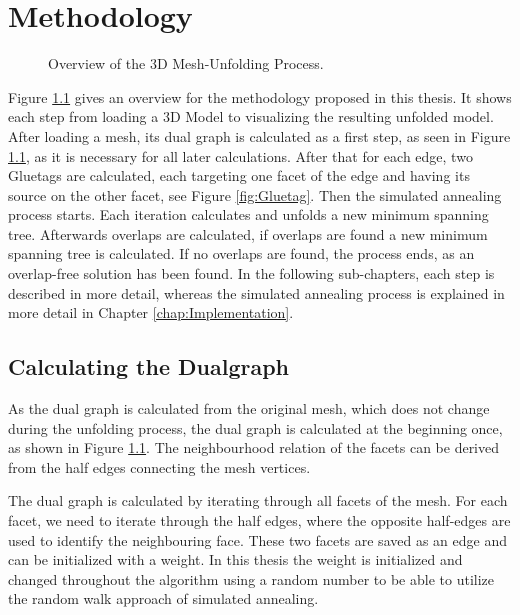 \documentclass[draft,final]{vutinfth} %
\begin{document}
\chapter{Methodology}
\label{chap:methodology}

\begin{figure}

\caption{Overview of the 3D Mesh-Unfolding Process.}
\label{fig:overview}
\end{figure}

Figure \ref{fig:overview} gives an overview for the methodology proposed in this thesis. It shows each step from loading a 3D Model to visualizing the resulting unfolded model. After loading a mesh, its dual graph is calculated as a first step, as seen in Figure \ref{fig:overview}, as it is necessary for all later calculations. After that for each edge, two Gluetags are calculated, each targeting one facet of the edge and having its source on the other facet, see Figure \ref{fig:Gluetag}. Then the simulated annealing process starts. Each iteration calculates and unfolds a new minimum spanning tree. Afterwards overlaps are calculated, if overlaps are found a new minimum spanning tree is calculated. If no overlaps are found, the process ends, as an overlap-free solution has been found. In the following sub-chapters, each step is described in more detail, whereas the simulated annealing process is explained in more detail in Chapter \ref{chap:Implementation}.

\section{Calculating the Dualgraph}
\label{sec:calcdual}
As the dual graph is calculated from the original mesh, which does not change during the unfolding process, the dual graph is calculated at the beginning once, as shown in Figure \ref{fig:overview}. The neighbourhood relation of the facets can be derived from the half edges connecting the mesh vertices. 

The dual graph is calculated by iterating through all facets of the mesh. For each facet, we need to iterate through the half edges, where the opposite half-edges are used to identify the neighbouring face. These two facets are saved as an edge and can be initialized with a weight. In this thesis the weight is initialized and changed throughout the algorithm using a random number to be able to utilize the random walk approach of simulated annealing.
\end{document}
